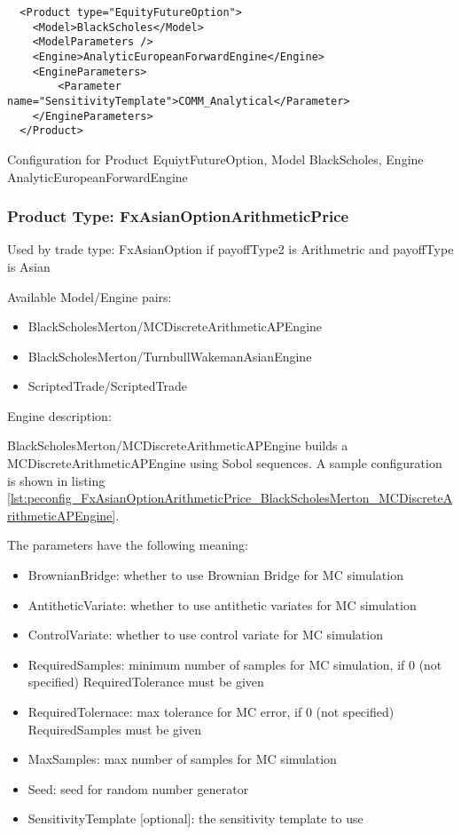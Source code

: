 \begin{longlisting}
\begin{verbatim}
  <Product type="EquityFutureOption">
    <Model>BlackScholes</Model>
    <ModelParameters />
    <Engine>AnalyticEuropeanForwardEngine</Engine>
    <EngineParameters>
        <Parameter name="SensitivityTemplate">COMM_Analytical</Parameter>
    </EngineParameters>
  </Product>
\end{verbatim}
\caption{Configuration for Product EquiytFutureOption, Model BlackScholes, Engine AnalyticEuropeanForwardEngine}
\label{lst:peconfig_EquityFutureOption_BlackScholes_AnalyticEuropeanForwardEngine}
\end{longlisting}

\subsubsection{Product Type: FxAsianOptionArithmeticPrice}

Used by trade type: FxAsianOption if payoffType2 is Arithmetric and payoffType is Asian

Available Model/Engine pairs:

\begin{itemize}
  \item BlackScholesMerton/MCDiscreteArithmeticAPEngine
  \item BlackScholesMerton/TurnbullWakemanAsianEngine
  \item ScriptedTrade/ScriptedTrade
\end{itemize}

Engine description:

BlackScholesMerton/MCDiscreteArithmeticAPEngine builds a MCDiscreteArithmeticAPEngine using Sobol sequences. A sample
configuration is shown in listing
\ref{lst:peconfig_FxAsianOptionArithmeticPrice_BlackScholesMerton_MCDiscreteArithmeticAPEngine}.

The parameters have the following meaning:

\begin{itemize}
\item BrownianBridge: whether to use Brownian Bridge for MC simulation
\item AntitheticVariate: whether to use antithetic variates for MC simulation
\item ControlVariate: whether to use control variate for MC simulation
\item RequiredSamples: minimum number of samples for MC simulation, if 0 (not specified) RequiredTolerance must be given
\item RequiredTolernace: max tolerance for MC error, if 0 (not specified) RequiredSamples must be given
\item MaxSamples: max number of samples for MC simulation
\item Seed: seed for random number generator
\item SensitivityTemplate [optional]: the sensitivity template to use 
\end{itemize}

